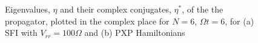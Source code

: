 \begin{figure}
  \centering
  \caption{Eigenvalues, $\eta$ and their complex conjugates, $\eta^*$,
    of the the propagator, plotted in the complex place for $N=6$,
    $\Omega t=6$, for (a) SFI with $V_{rr}=100\Omega$ and (b) PXP
    Hamiltonians}
\end{figure}


